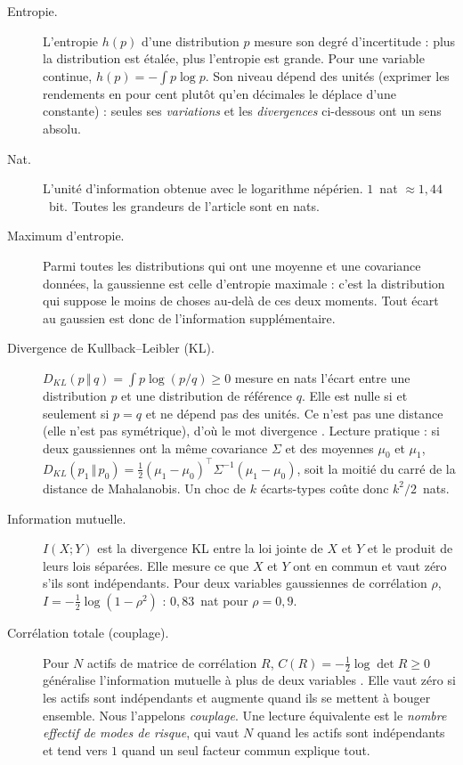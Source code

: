 \documentclass[11pt]{article}
\theoremstyle{definition}
\newcommand{\KL}[2]{D_{KL}\!\left(#1\,\Vert\,#2\right)}
\begin{document}
\begin{description}
\item[Entropie.] L'entropie $h(p)$ d'une distribution $p$ mesure son degré
d'incertitude : plus la distribution est étalée, plus l'entropie est grande.
Pour une variable continue, $h(p)=-\int p\log p$. Son niveau dépend des unités
(exprimer les rendements en pour cent plutôt qu'en décimales le déplace d'une
constante) : seules ses \emph{variations} et les \emph{divergences} ci-dessous
ont un sens absolu.

\item[Nat.] L'unité d'information obtenue avec le logarithme népérien.
$1$~nat $\approx 1{,}44$~bit. Toutes les grandeurs de l'article sont en nats.

\item[Maximum d'entropie.] Parmi toutes les distributions qui ont une moyenne et
une covariance données, la gaussienne est celle d'entropie maximale : c'est la
distribution qui suppose le moins de choses au-delà de ces deux moments. Tout
écart au gaussien est donc de l'information supplémentaire.

\item[Divergence de Kullback--Leibler (KL).] $\KL{p}{q}=\int p\log(p/q)\ge0$
mesure en nats l'écart entre une distribution $p$ et une distribution de
référence $q$. Elle est nulle si et seulement si $p=q$ et ne dépend pas des
unités. Ce n'est pas une distance (elle n'est pas symétrique), d'où le mot
\og divergence \fg. Lecture pratique : si deux gaussiennes ont la même
covariance $\Sigma$ et des moyennes $\mu_0$ et $\mu_1$,
$\KL{p_1}{p_0}=\tfrac12(\mu_1-\mu_0)^\top\Sigma^{-1}(\mu_1-\mu_0)$, soit la
moitié du carré de la distance de Mahalanobis. Un choc de $k$ écarts-types
coûte donc $k^2/2$~nats.

\item[Information mutuelle.] $I(X;Y)$ est la divergence KL entre la loi jointe
de $X$ et $Y$ et le produit de leurs lois séparées. Elle mesure ce que $X$ et
$Y$ ont en commun et vaut zéro s'ils sont indépendants. Pour deux variables
gaussiennes de corrélation $\rho$, $I=-\tfrac12\log(1-\rho^2)$ : $0{,}83$~nat
pour $\rho=0{,}9$.

\item[Corrélation totale (couplage).] Pour $N$ actifs de matrice de corrélation
$R$, $C(R)=-\tfrac12\log\det R\ge0$ généralise l'information mutuelle à plus de
deux variables \citep{watanabe1960}. Elle vaut zéro si les actifs sont
indépendants et augmente quand ils se mettent à bouger ensemble. Nous
l'appelons \emph{couplage}. Une lecture équivalente est le \emph{nombre
effectif de modes de risque}, qui vaut $N$ quand les actifs sont indépendants
et tend vers $1$ quand un seul facteur commun explique tout.


\end{description}
\end{document}
